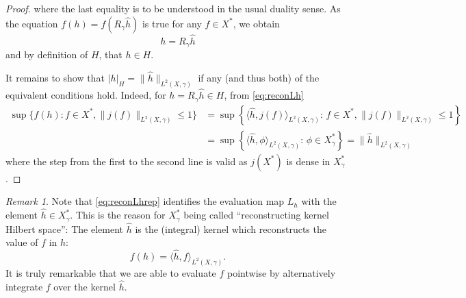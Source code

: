 \documentclass{scrartcl}
\theoremstyle{definition}
\theoremstyle{remark}
\newtheorem{remark}{Remark}
\begin{document}
\begin{proof}
where the last equality is to be understood in the usual duality sense. As the equation $f(h) = f(R_\gamma \hat h)$ is true for any $f\in X^*$, we obtain 
\[ h = R_\gamma\hat h \]
and by definition of $H$, that $h\in H$.

It remains to show that $|h|_H = \|\hat h\|_{L^2(X,\gamma)}$ if any (and thus both) of the equivalent conditions hold. Indeed, for $h = R_\gamma \hat h \in H$, from \eqref{eq:reconLh}
\begin{align*}
\sup\{f(h): f\in X^*, \|j(f)\|_{L^2(X,\gamma)}\leq 1\} &= \sup\left\{\langle \hat h, j(f) \rangle_{L^2(X,\gamma)}:\, f\in X^*, \|j(f)\|_{L^2(X,\gamma)}\leq 1\right\}\\
&= \sup\left\{\langle \hat h, \phi\rangle_{L^2(X,\gamma)}:\, \phi\in X_\gamma^*\right\} = \|\hat h\|_{L^2(X, \gamma)}
\end{align*}
where the step from the first to the second line is valid as $j(X^*)$ is dense in $X_\gamma^*$.
\end{proof}
\begin{remark}\label{rem:RKHS}
Note that \eqref{eq:reconLhrep} identifies the evaluation map $L_h$ with the element $\hat h \in X_\gamma^*$. This is the reason for $X_\gamma^*$ being called ``reconstructing kernel Hilbert space'': The element $\hat h$ is the (integral) kernel which reconstructs the value of $f$ in $h$:
\[ f(h) = \langle \hat h, f\rangle_{L^2(X,\gamma)}.\]
It is truly remarkable that we are able to evaluate $f$ pointwise by alternatively integrate $f$ over the kernel $\hat h$.
\end{remark}
\end{document}
